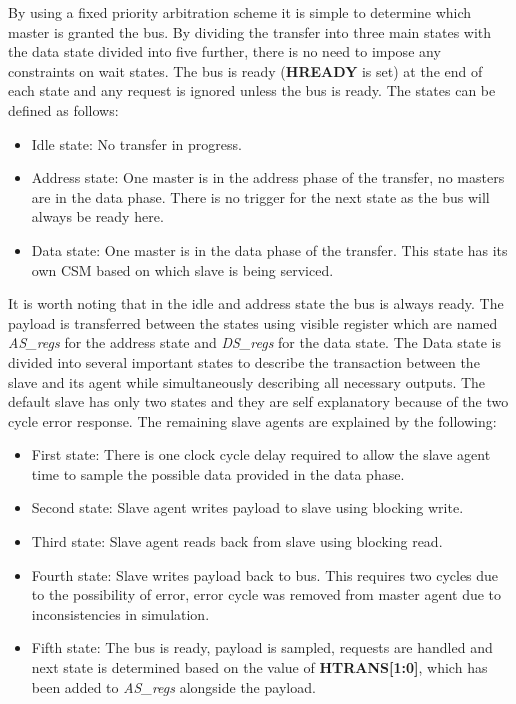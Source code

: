 By using a fixed priority arbitration scheme it is simple to determine which master is granted the bus. By dividing the transfer into three main states with the data state divided into five further, there is no need to impose any constraints on wait states. The bus is ready (\textbf{HREADY} is set) at the end of each state and any request is ignored unless the bus is ready. The states can be defined as follows:
\begin{itemize}
\item Idle state: No transfer in progress.
\item Address state: One master is in the address phase of the transfer, no masters are in the data phase. There is no trigger for the next state as the bus will always be ready here. 
\item Data state: One master is in the data phase of the transfer. This state has its own CSM based on which slave is being serviced.  
\end{itemize}

It is worth noting that in the idle and address state the bus is always ready. The payload is transferred between the states using visible register which are named \textit{AS\_regs} for the address state and \textit{DS\_regs} for the data state. The Data state is divided into several important states to describe the transaction between the slave and its agent while simultaneously describing all necessary outputs. The default slave has only two states and they are self explanatory because of the two cycle error response. The remaining slave agents are explained by the following:
\begin{itemize}
 \item First state: There is one clock cycle delay required to allow the slave agent time to sample the possible data provided in the data phase.
 \item Second state: Slave agent writes payload to slave using blocking write. 
 \item Third state: Slave agent reads back from slave using blocking read.
 \item Fourth state: Slave writes payload back to bus. This requires two cycles due to the possibility of error, error cycle was removed from master agent due to inconsistencies in simulation.  
 \item Fifth state: The bus is ready, payload is sampled, requests are handled and next state is determined based on the value of \textbf{HTRANS[1:0]}, which has been added to \textit{AS\_regs} alongside the payload. 
\end{itemize}

